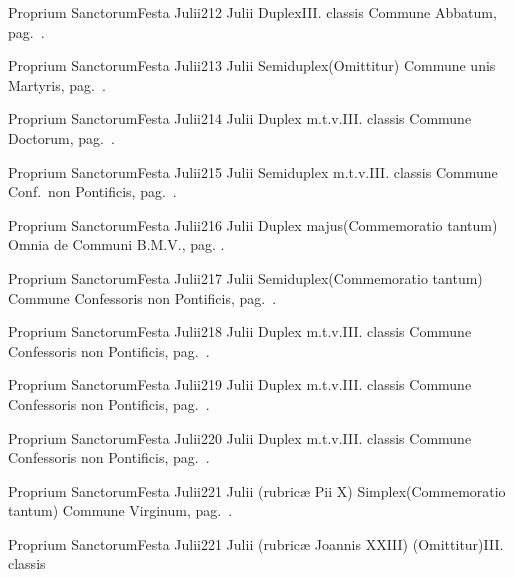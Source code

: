 \documentclass[nocturnale-romanum.tex]{subfiles}
\begin{document}
	{Proprium Sanctorum}{Festa Julii}{2}{12 Julii}
	{Duplex}{III. classis}
	{Commune Abbatum, pag.\ \pageref{M-COAB}.}
	{}

	{Proprium Sanctorum}{Festa Julii}{2}{13 Julii}
	{Semiduplex}{(Omittitur)}
	{Commune unis Martyris, pag.\ \pageref{M-UMEX}.}
	{}

	{Proprium Sanctorum}{Festa Julii}{2}{14 Julii}
	{Duplex m.t.v.}{III. classis}
	{Commune Doctorum, pag.\ \pageref{M-CODO}.}
	{}

	{Proprium Sanctorum}{Festa Julii}{2}{15 Julii}
	{Semiduplex m.t.v.}{III. classis}
	{Commune Conf.\ non Pontificis, pag.\ \pageref{M-CONP}.}
	{}

	{Proprium Sanctorum}{Festa Julii}{2}{16 Julii}
	{Duplex majus}{(Commemoratio tantum)}
	{Omnia de Communi B.M.V., pag. \pageref{M-CBMV}.}
	{}

	{Proprium Sanctorum}{Festa Julii}{2}{17 Julii}
	{Semiduplex}{(Commemoratio tantum)}
	{Commune Confessoris non Pontificis, pag.\ \pageref{M-CONP}.}
	{}

	{Proprium Sanctorum}{Festa Julii}{2}{18 Julii}
	{Duplex m.t.v.}{III. classis}
	{Commune Confessoris non Pontificis, pag.\ \pageref{M-CONP}.}
	{}

	{Proprium Sanctorum}{Festa Julii}{2}{19 Julii}
	{Duplex m.t.v.}{III. classis}
	{Commune Confessoris non Pontificis, pag.\ \pageref{M-CONP}.}
	{}

	{Proprium Sanctorum}{Festa Julii}{2}{20 Julii}
	{Duplex m.t.v.}{III. classis}
	{Commune Confessoris non Pontificis, pag.\ \pageref{M-CONP}.}
	{}

	{Proprium Sanctorum}{Festa Julii}{2}{21 Julii (rubricæ Pii X)}
	{Simplex}{(Commemoratio tantum)}
	{Commune Virginum, pag.\ \pageref{M-MU}.}
	{}

	{Proprium Sanctorum}{Festa Julii}{2}{21 Julii (rubricæ Joannis XXIII)}
	{(Omittitur)}{III. classis}
	{}
	{}
\end{document}
